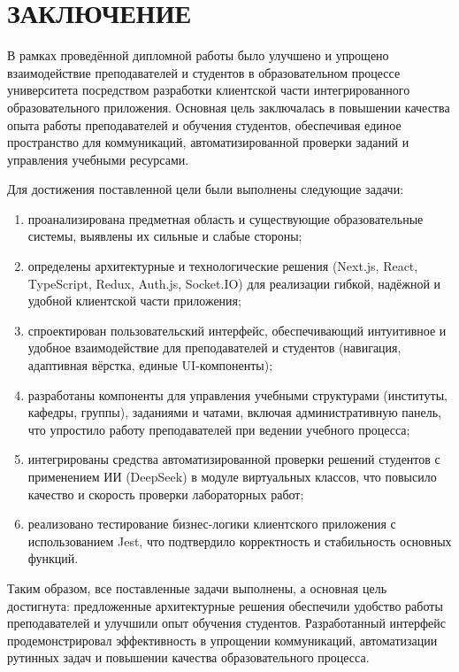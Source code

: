 \newpage
{}
\section*{ЗАКЛЮЧЕНИЕ}

В рамках проведённой дипломной работы было улучшено и упрощено взаимодействие преподавателей и студентов в образовательном процессе университета посредством разработки клиентской части интегрированного образовательного приложения. Основная цель заключалась в повышении качества опыта работы преподавателей и обучения студентов, обеспечивая единое пространство для коммуникаций, автоматизированной проверки заданий и управления учебными ресурсами.

Для достижения поставленной цели были выполнены следующие задачи:
\begin{enumerate}
  \item проанализирована предметная область и существующие образовательные системы, выявлены их сильные и слабые стороны;
  \item определены архитектурные и технологические решения (Next.js, React, TypeScript, Redux, Auth.js, Socket.IO) для реализации гибкой, надёжной и удобной клиентской части приложения;
  \item спроектирован пользовательский интерфейс, обеспечивающий интуитивное и удобное взаимодействие для преподавателей и студентов (навигация, адаптивная вёрстка, единые UI-компоненты);
  \item разработаны компоненты для управления учебными структурами (институты, кафедры, группы), заданиями и чатами, включая административную панель, что упростило работу преподавателей при ведении учебного процесса;
  \item интегрированы средства автоматизированной проверки решений студентов с применением ИИ (DeepSeek) в модуле виртуальных классов, что повысило качество и скорость проверки лабораторных работ;
  \item реализовано тестирование бизнес-логики клиентского приложения с использованием Jest, что подтвердило корректность и стабильность основных функций.
\end{enumerate}

Таким образом, все поставленные задачи выполнены, а основная цель достигнута: предложенные архитектурные решения обеспечили удобство работы преподавателей и улучшили опыт обучения студентов. Разработанный интерфейс продемонстрировал эффективность в упрощении коммуникаций, автоматизации рутинных задач и повышении качества образовательного процесса.

